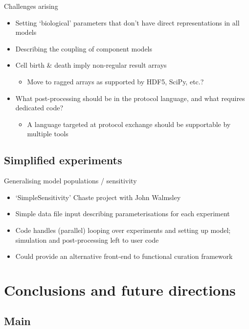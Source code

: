 \documentclass[t,xcolor={usenames,dvipsnames}]{beamer}
\newcommand{\subitem}[1]{\begin{itemize}[<.->]\item #1 \end{itemize}}
\begin{document}
\begin{frame}{Challenges arising}
\begin{itemize}
\item Setting `biological' parameters that don't have direct representations in all models
\item Describing the coupling of component models
\item Cell birth \& death imply non-regular result arrays
  \subitem{Move to ragged arrays as supported by HDF5, SciPy, etc.?}
\item What post-processing should be in the protocol language, and what requires dedicated code?
  \subitem{A language targeted at protocol exchange should be supportable by multiple tools}
\end{itemize}
\end{frame}

\subsection{Simplified experiments}

\begin{frame}{Generalising model populations / sensitivity}
\begin{itemize}
\item `SimpleSensitivity' Chaste project with John Walmsley
\item Simple data file input describing parameterisations for each experiment
\item Code handles (parallel) looping over experiments and setting up model; simulation and post-processing left to user code
\item Could provide an alternative front-end to functional curation framework
\end{itemize}
\end{frame}

\section{Conclusions and future directions}
\subsection*{Main}
\end{document}
